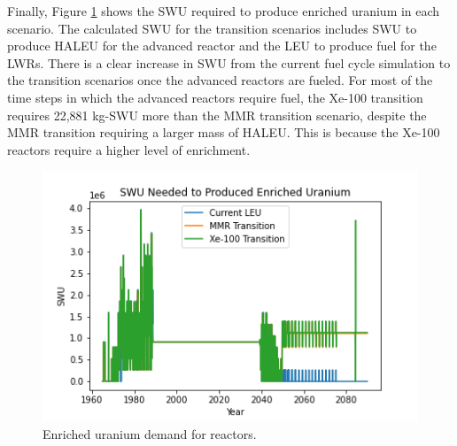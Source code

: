 Finally, Figure \ref{fig:swu} shows the \gls{SWU} required to 
produce enriched uranium in each scenario. The calculated 
\gls{SWU} for the transition scenarios includes \gls{SWU} to 
produce \gls{HALEU} for the advanced reactor and the \gls{LEU}
to produce fuel for the \gls{LWR}s. There is a clear increase 
in \gls{SWU} from the current fuel cycle simulation to the 
transition scenarios once the advanced reactors are fueled. 
For most of the time steps in which the advanced reactors 
require fuel, the Xe-100 transition requires 22,881 kg-SWU 
more than the MMR transition scenario, despite the MMR 
transition requiring a larger mass of \gls{HALEU}. This is 
because the Xe-100 reactors require a higher level of 
enrichment.  

\begin{figure}[ht]
    \centering
    \includegraphics[scale=0.5]{figures/swu_all.png}
    \caption{Enriched uranium demand for reactors.}
    \label{fig:swu}
\end{figure}